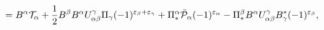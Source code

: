 \begin{equation}
=B^\alpha{\cal T}_\alpha+\frac{1}{2}B^\beta B^\alpha U^\gamma_{\alpha\beta}
\Pi_\gamma(-1)^{\varepsilon_\beta+\varepsilon_\gamma}+
\Pi^\alpha_*\bar{\cal P}_\alpha(-1)^{\varepsilon_\alpha}-
\Pi_*^\beta B^\alpha U^\gamma_{\alpha\beta}B^*_\gamma(-1)^{\varepsilon_\beta},
\label{4.34}
\end{equation}

